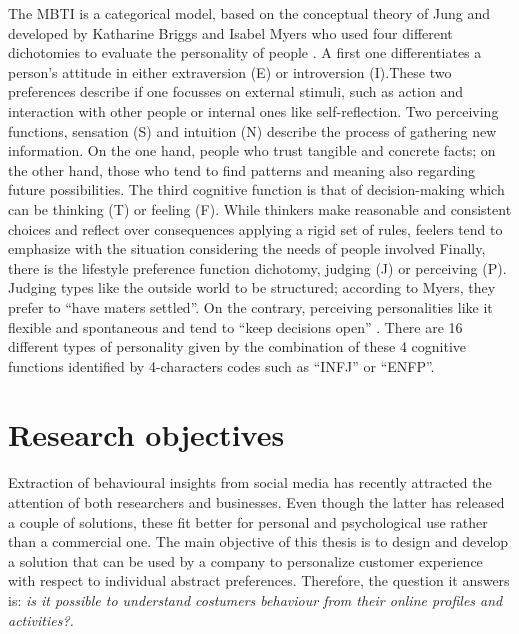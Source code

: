 The MBTI is a categorical model, based on the conceptual theory of Jung and developed by Katharine Briggs and Isabel Myers who used four different dichotomies to evaluate the personality of people \cite{jung1971personality}. 
A first one differentiates a person's attitude in either extraversion (E) or introversion (I).These two preferences describe if one focusses on external stimuli, such as action and interaction with other people or internal ones like self-reflection.
Two perceiving functions, sensation (S) and intuition (N) describe the process of gathering new information. On the one hand, people who trust tangible and concrete facts; on the other hand, those who tend to find patterns and meaning also regarding future possibilities.
The third cognitive function is that of decision-making which can be thinking (T) or feeling (F). While thinkers make reasonable and consistent choices and reflect over consequences applying a rigid set of rules, feelers tend to emphasize with the situation considering the needs of people involved
Finally, there is the lifestyle preference function dichotomy, judging (J) or perceiving (P). Judging types like the outside world to be structured; according to Myers, they prefer to ``have maters settled''. On the contrary, perceiving personalities like it flexible and spontaneous and tend to ``keep decisions open'' \cite{myers2010gifts}.
There are 16 different types of personality given by the combination of these 4 cognitive functions identified by 4-characters codes such as ``INFJ'' or ``ENFP''.

\section{Research objectives}
\label{sec:resObj}
Extraction of behavioural insights from social media has recently attracted the attention of both researchers and businesses.
Even though the latter has released a couple of solutions, these fit better for personal and psychological use rather than a commercial one.
The main objective of this thesis is to design and develop a solution that can be used by a company to personalize customer experience with respect to individual abstract preferences.
Therefore, the question it answers is: \textit{is it possible to understand costumers behaviour from their online profiles and activities?.}

